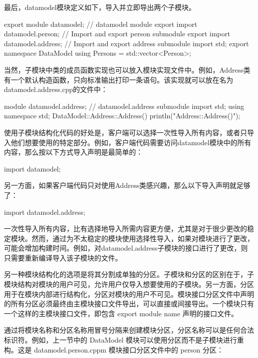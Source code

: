 最后，datamodel模块定义如下，导入并立即导出两个子模块。

\begin{cpp}
export module datamodel; // datamodel module
export import datamodel.person; // Import and export person submodule
export import datamodel.address; // Import and export address submodule
import std;
export namespace DataModel { using Persons = std::vector<Person>; }
\end{cpp}

当然，子模块中类的成员函数实现也可以放入模块实现文件中。例如，Address类有一个默认构造函数，只向标准输出打印一条语句。该实现就可以放在名为datamodel.address.cpp的文件中：

\begin{cpp}
module datamodel.address; // datamodel.address submodule
import std;
using namespace std;
DataModel::Address::Address() { println("Address::Address()"); }
\end{cpp}

使用子模块结构化代码的好处是，客户端可以选择一次性导入所有内容，或者只导入他们想要使用的特定部分。例如，客户端代码需要访问datamodel模块中的所有内容，那么按以下方式导入声明是最简单的：

\begin{cpp}
import datamodel;
\end{cpp}

另一方面，如果客户端代码只对使用Address类感兴趣，那么以下导入声明就足够了：

\begin{cpp}
import datamodel.address;
\end{cpp}

一次性导入所有内容，比有选择地导入所需内容更方便，尤其是对于很少更改的稳定模块。然而，通过为不太稳定的模块使用选择性导入，如果对模块进行了更改，可能会增加构建时间。例如，对datamodel.address子模块的接口进行了更改，则只需要重新编译导入该子模块的文件。


另一种模块结构化的选项是将其分割成单独的分区。子模块和分区的区别在于，子模块结构对模块的用户可见，允许用户仅导入想要使用的子模块。另一方面，分区用于在模块内部进行结构化，分区对模块的用户不可见。模块接口分区文件中声明的所有分区必须最终由主模块接口文件导出，可以直接或间接导出。一个模块只有一个这样的主模块接口文件，即包含 export module name 声明的接口文件。

通过将模块名称和分区名称用冒号分隔来创建模块分区，分区名称可以是任何合法标识符。例如，上一节中的 DataModel 模块可以使用分区而不是子模块进行重构。这是 datamodel.person.cppm 模块接口分区文件中的 person 分区：


